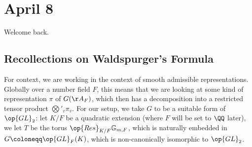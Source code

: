 \documentclass[../notes.tex]{subfiles}
\begin{document}
\section{April 8}
Welcome back.

\subsection{Recollections on Waldspurger's Formula}
For context, we are working in the context of smooth admissible representations. Globally over a number field $F$, this means that we are looking at some kind of representation $\pi$ of $G(\AA_F)$, which then has a decomposition into a restricted tensor product $\bigotimes'_v\pi_v$. For our setup, we take $G$ to be a suitable form of $\op{GL}_2$: let $K/F$ be a quadratic extension (where $F$ will be set to $\QQ$ later), we let $T$ be the torus $\op{Res}_{K/F}\mathbb G_{m,F}$, which is naturally embedded in $G\coloneqq\op{GL}_F(K)$, which is non-canonically isomorphic to $\op{GL}_2$.
\end{document}
